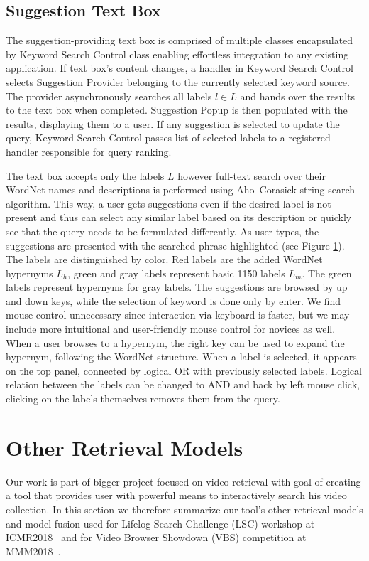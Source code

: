 \subsection{Suggestion Text Box}
The suggestion-providing text box is comprised of multiple classes encapsulated by Keyword Search Control class enabling effortless integration to any existing application. If text box's content changes, a handler in Keyword Search Control selects Suggestion Provider belonging to the currently selected keyword source. The provider asynchronously searches all labels $l\in L$ and hands over the results to the text box when completed. Suggestion Popup is then populated with the results, displaying them to a user. If any suggestion is selected to update the query, Keyword Search Control passes list of selected labels to a registered handler responsible for query ranking.

The text box accepts only the labels $L$ however full-text search over their WordNet names and descriptions is performed using Aho--Corasick string search algorithm. This way, a user gets suggestions even if the desired label is not present and thus can select any similar label based on its description or quickly see that the query needs to be formulated differently. As user types, the suggestions are presented with the searched phrase highlighted (see Figure \ref{}). The labels are distinguished by color. Red labels are the added WordNet hypernyms $L_h$, green and gray labels represent basic 1150 labels $L_m$. The green labels represent hypernyms for gray labels. The suggestions are browsed by up and down keys, while the selection of keyword is done only by enter. We find mouse control unnecessary since interaction via keyboard is faster, but we may include more intuitional and user-friendly mouse control for novices as well. When a user browses to a hypernym, the right key can be used to expand the hypernym, following the WordNet structure. When a label is selected, it appears on the top panel, connected by logical \textsf{OR} with previously selected labels. Logical relation between the labels can be changed to \textsf{AND} and back by left mouse click, clicking on the labels themselves removes them from the query.

\section{Other Retrieval Models}
Our work is part of bigger project focused on video retrieval with goal of creating a tool that provides user with powerful means to interactively search his video collection. In this section we therefore summarize our tool's other retrieval models and model fusion used for Lifelog Search Challenge (LSC) workshop at ICMR2018~\cite{LokocLSC} and for Video Browser Showdown (VBS) competition at MMM2018~\cite{lokovc2018revisiting}.

